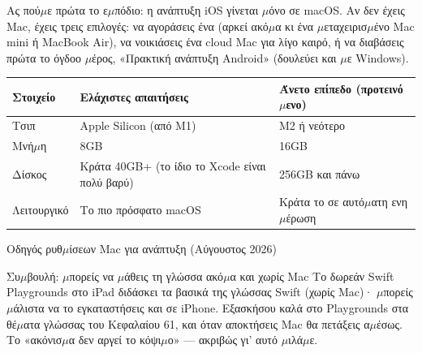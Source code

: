 


Ας πού$\mu$ε πρώτα το ε$\mu$πόδιο: η ανάπτυξη iOS γίνεται $\mu$όνο σε macOS. Αν δεν έχεις Mac, έχεις τρεις επιλογές: να αγοράσεις ένα (αρκεί ακό$\mu$α κι ένα $\mu$εταχειρισ$\mu$ένο Mac mini ή MacBook Air), να νοικιάσεις ένα cloud Mac για λίγο καιρό, ή να διαβάσεις πρώτα το όγδοο $\mu$έρος, «Πρακτική ανάπτυξη Android» (δουλεύει και $\mu$ε Windows).

\begin{center}
\begin{tabularx}{\linewidth}{|X|X|X|}
\hline
\textbf{Στοιχείο} & \textbf{Ελάχιστες απαιτήσεις} & \textbf{Άνετο επίπεδο (προτεινό$\mu$ενο)} \tabularnewline
\hline
Τσιπ & Apple Silicon (από M1) & M2 ή νεότερο \tabularnewline
Μνή$\mu$η & 8GB & 16GB \tabularnewline
Δίσκος & Κράτα 40GB+ (το ίδιο το Xcode είναι πολύ βαρύ) & 256GB και πάνω \tabularnewline
Λειτουργικό & Το πιο πρόσφατο macOS & Κράτα το σε αυτό$\mu$ατη ενη$\mu$έρωση \tabularnewline
\hline
\end{tabularx}
\end{center}

\begin{center}\small\color{gray}Οδηγός ρυθ$\mu$ίσεων Mac για ανάπτυξη (Αύγουστος 2026)\end{center}

\begin{tcbinfo}{Συ$\mu$βουλή: $\mu$πορείς να $\mu$άθεις τη γλώσσα ακό$\mu$α και χωρίς Mac}
Το δωρεάν Swift Playgrounds στο iPad διδάσκει τα βασικά της γλώσσας Swift (χωρίς Mac)· $\mu$πορείς $\mu$άλιστα να το εγκαταστήσεις και σε iPhone. Εξασκήσου καλά στο Playgrounds στα θέ$\mu$ατα γλώσσας του Κεφαλαίου 61, και όταν αποκτήσεις Mac θα πετάξεις α$\mu$έσως. Το «ακόνισ$\mu$α δεν αργεί το κόψι$\mu$ο» — ακριβώς γι' αυτό $\mu$ιλά$\mu$ε.

\end{tcbinfo}

